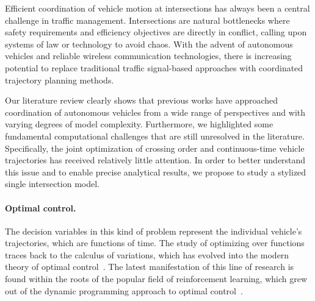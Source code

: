 \documentclass[a4paper]{report}
\theoremstyle{definition}
\theoremstyle{plain}
\begin{document}

Efficient coordination of vehicle motion at intersections has always been a
central challenge in traffic management. Intersections are natural bottlenecks
where safety requirements and efficiency objectives are directly in conflict,
calling upon systems of law or technology to avoid chaos.
%
With the advent of autonomous vehicles and reliable wireless communication
technologies, there is increasing potential to replace traditional traffic
signal-based approaches with coordinated trajectory planning methods.

Our literature review clearly shows that previous works have approached
coordination of autonomous vehicles from a wide range of perspectives and with
varying degrees of model complexity.
%
Furthermore, we highlighted some fundamental computational challenges that are
still unresolved in the literature.
%
Specifically, the joint optimization of crossing order and continuous-time
vehicle trajectories has received relatively little attention.
%
In order to better understand this issue and to enable precise analytical
results, we propose to study a stylized single intersection model.

\paragraph{Optimal control.}

The decision variables in this kind of problem represent the individual
vehicle's trajectories, which are functions of time.
%
The study of optimizing over functions traces back to the calculus of
variations, which has evolved into the modern theory of optimal
control~\cite{liberzonCalculusVariationsOptimal}.
%
The latest manifestation of this line of research is found within the roots of
the popular field of reinforcement learning, which grew out of the dynamic
programming approach to optimal
control~\cite{bellmanDynamicProgramming1984,bertsekas2012dynamic,putermanMarkovDecisionProcesses2009,suttonReinforcementLearningIntroduction2018}.


\end{document}
